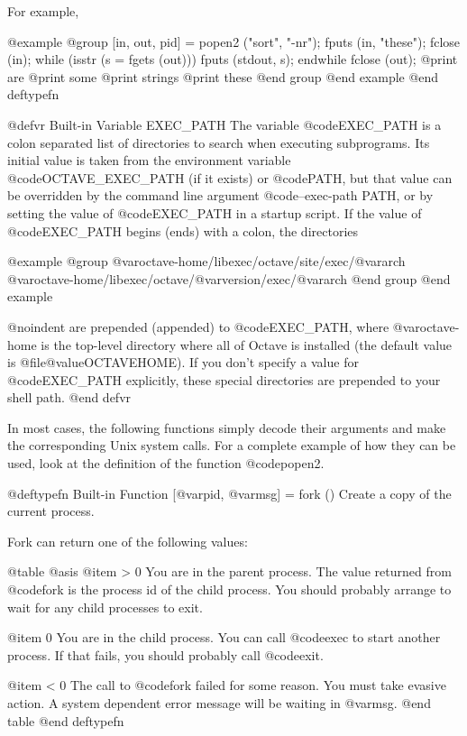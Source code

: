 {{For example,

@example
@group
[in, out, pid] = popen2 ("sort", "-nr");
fputs (in, "these\nare\nsome\nstrings\n");
fclose (in);
while (isstr (s = fgets (out)))
  fputs (stdout, s);
endwhile
fclose (out);
     @print{} are
     @print{} some
     @print{} strings
     @print{} these
@end group
@end example
@end deftypefn

@defvr {Built-in Variable} EXEC_PATH
The variable @code{EXEC_PATH} is a colon separated list of directories
to search when executing subprograms.  Its initial value is taken from
the environment variable @code{OCTAVE_EXEC_PATH} (if it exists) or
@code{PATH}, but that value can be overridden by the command line
argument @code{--exec-path PATH}, or by setting the value of
@code{EXEC_PATH} in a startup script.  If the value of @code{EXEC_PATH}
begins (ends) with a colon, the directories

@example
@group
@var{octave-home}/libexec/octave/site/exec/@var{arch}
@var{octave-home}/libexec/octave/@var{version}/exec/@var{arch}
@end group
@end example

@noindent
are prepended (appended) to @code{EXEC_PATH}, where @var{octave-home}
is the top-level directory where all of Octave is installed
(the default value is @file{@value{OCTAVEHOME}}).  If you don't specify
a value for @code{EXEC_PATH} explicitly, these special directories are
prepended to your shell path.
@end defvr

In most cases, the following functions simply decode their arguments and
make the corresponding Unix system calls.  For a complete example of how
they can be used, look at the definition of the function @code{popen2}.

@deftypefn {Built-in Function} {[@var{pid}, @var{msg}] =} fork ()
Create a copy of the current process.

Fork can return one of the following values:

@table @asis
@item > 0
You are in the parent process.  The value returned from @code{fork} is
the process id of the child process.  You should probably arrange to
wait for any child processes to exit.

@item 0
You are in the child process.  You can call @code{exec} to start another
process.  If that fails, you should probably call @code{exit}.

@item < 0
The call to @code{fork} failed for some reason.  You must take evasive
action.  A system dependent error message will be waiting in @var{msg}.
@end table
@end deftypefn

}}
